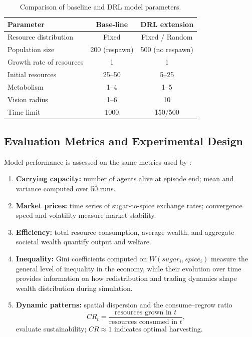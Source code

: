 \documentclass[pdflatex,sn-mathphys-num]{sn-jnl}%
\theoremstyle{thmstyleone}%
\theoremstyle{thmstyletwo}%
\theoremstyle{thmstylethree}%
\begin{document}
\begin{table}[h!]
\centering
\caption{Comparison of baseline and DRL model parameters.}
\label{tab:baseline_params}
\begin{tabular}{lcc}
\hline
\textbf{Parameter} & \textbf{Base-line} & \textbf{DRL extension} \\
\hline
Resource distribution & Fixed & Fixed / Random \\
Population size & 200 (respawn) & 500 (no respawn) \\
Growth rate of resources & 1 & 1 \\
Initial resources & 25--50 & 5--25 \\
Metabolism & 1--4 & 1--5 \\
Vision radius & 1--6 & 10 \\
Time limit & 1000 & 150/500 \\
\hline
\end{tabular}
\end{table}

\subsection{Evaluation Metrics and Experimental Design}
Model performance is assessed on the same metrics used by \citet{EpsteinAxtell1996}:

\begin{enumerate}
\item \textbf{Carrying capacity:} number of agents alive at episode end; mean and variance computed over 50 runs.  
\item \textbf{Market prices:} time series of sugar-to-spice exchange rates; convergence speed and volatility measure market stability.  
\item \textbf{Efficiency:} total resource consumption, average wealth, and aggregate societal wealth quantify output and welfare.  
\item \textbf{Inequality:} Gini coefficients computed on $W(sugar_i, spice_i)$ measure the general level of inequality in the economy, while their evolution over time provides information on how redistribution and trading dynamics shape wealth distribution during simulation.
\item \textbf{Dynamic patterns:} spatial dispersion and the consume–regrow ratio
\[
CR_t=\frac{\text{resources grown in }t}{\text{resources consumed in }t},
\]
evaluate sustainability; \(CR\approx1\) indicates optimal harvesting.
\end{enumerate}
\end{document}
